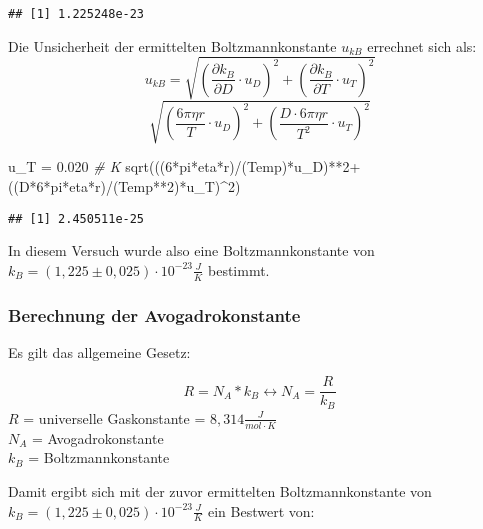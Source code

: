 \documentclass[class=article, crop=false]{standalone}
\newenvironment{Shaded}{\begin{snugshade}}{\end{snugshade}}
\newcommand{\CommentTok}[1]{\textcolor[rgb]{0.56,0.35,0.01}{\textit{#1}}}
\newcommand{\DecValTok}[1]{\textcolor[rgb]{0.00,0.00,0.81}{#1}}
\newcommand{\FloatTok}[1]{\textcolor[rgb]{0.00,0.00,0.81}{#1}}
\newcommand{\FunctionTok}[1]{\textcolor[rgb]{0.00,0.00,0.00}{#1}}
\newcommand{\NormalTok}[1]{#1}
\newcommand{\OtherTok}[1]{\textcolor[rgb]{0.56,0.35,0.01}{#1}}
\newcommand{\SpecialCharTok}[1]{\textcolor[rgb]{0.00,0.00,0.00}{#1}}
\begin{document}
\begin{verbatim}
## [1] 1.225248e-23
\end{verbatim}

Die Unsicherheit der ermittelten Boltzmannkonstante \(u_{kB}\) errechnet
sich als:
\[u_{kB} = \sqrt{(\frac{\partial k_B}{\partial D}\cdot u_D)^2 + (\frac{\partial k_B}{\partial T}\cdot u_T)^2}\]
\[\sqrt{(\frac{6\pi \eta r}{T}\cdot u_D)^2+(\frac{D\cdot 6\pi \eta r}{T^2} \cdot u_T)^2}\]

\begin{Shaded}
\begin{Highlighting}[]
\NormalTok{u\_T }\OtherTok{=} \FloatTok{0.020} \CommentTok{\# K}
\FunctionTok{sqrt}\NormalTok{(((}\DecValTok{6}\SpecialCharTok{*}\NormalTok{pi}\SpecialCharTok{*}\NormalTok{eta}\SpecialCharTok{*}\NormalTok{r)}\SpecialCharTok{/}\NormalTok{(Temp)}\SpecialCharTok{*}\NormalTok{u\_D)}\SpecialCharTok{**}\DecValTok{2}\SpecialCharTok{+}\NormalTok{((D}\SpecialCharTok{*}\DecValTok{6}\SpecialCharTok{*}\NormalTok{pi}\SpecialCharTok{*}\NormalTok{eta}\SpecialCharTok{*}\NormalTok{r)}\SpecialCharTok{/}\NormalTok{(Temp}\SpecialCharTok{**}\DecValTok{2}\NormalTok{)}\SpecialCharTok{*}\NormalTok{u\_T)}\SpecialCharTok{\^{}}\DecValTok{2}\NormalTok{)}
\end{Highlighting}
\end{Shaded}

\begin{verbatim}
## [1] 2.450511e-25
\end{verbatim}

In diesem Versuch wurde also eine Boltzmannkonstante von
\(k_B = (1,225 \pm 0,025) \cdot 10^{-23} \frac{J}{K}\) bestimmt.

\hypertarget{berechnung-der-avogadrokonstante}{%
\subsubsection{Berechnung der
Avogadrokonstante}\label{berechnung-der-avogadrokonstante}}

Es gilt das allgemeine Gesetz:

\begin{equation*}
R=N_A*k_B \leftrightarrow N_A = \frac{R}{k_B}
\end{equation*} \noindent \(R\) = universelle Gaskonstante =
\(8,314 \frac{J}{mol\cdot K}\)\\
\noindent \(N_A\) = Avogadrokonstante\\
\noindent \(k_B\) = Boltzmannkonstante

Damit ergibt sich mit der zuvor ermittelten Boltzmannkonstante von
\(k_B = (1,225 \pm 0,025) \cdot 10^{-23} \frac{J}{K}\) ein Bestwert von:
\end{document}
